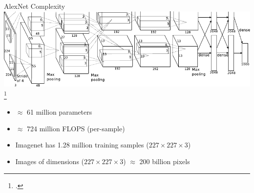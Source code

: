 \documentclass[t,xcolor=dvipsnames]{beamer}
\begin{document}
\begin{frame}{AlexNet Complexity}
\includegraphics[width=\columnwidth]{alexnet}\footcite{Krizhevsky2012}
\begin{itemize}
\item $\approx$ 61 million parameters %
\item $\approx$ 724 million FLOPS (per-sample) %
\item Imagenet has 1.28 million training samples ($227 \times 227 \times 3$) %
\item Images of dimensions  ($227 \times 227 \times 3$) $\approx$ 200 billion pixels %
\end{itemize}
\end{frame}
\end{document}
